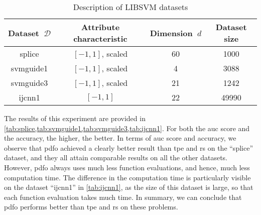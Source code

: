\begin{table}[ht]
    \caption{Description of LIBSVM datasets}
    \label{tab:htdata}
    \centering
    \begin{tabular}{ccS[table-parse-only]S[table-parse-only]}
        \toprule
        Dataset~$\mathcal{D}$   & Attribute characteristic  & {Dimension~$d$}   & {Dataset size}\\
        \midrule
        splice                  & $[-1, 1]$, scaled         & 60                & 1000\\
        svmguide1               & $[-1, 1]$, scaled         & 4                 & 3088\\
        svmguide3               & $[-1, 1]$, scaled         & 21                & 1242\\
        ijcnn1                  & $[-1, 1]$                 & 22                & 49990\\
        \bottomrule
    \end{tabular}
\end{table}
%

The results of this experiment are provided in \cref{tab:splice,tab:svmguide1,tab:svmguide3,tab:ijcnn1}.
For both the \gls{auc} score and the accuracy, the higher, the better.
In terms of \gls{auc} score and accuracy, we observe that \gls{pdfo} achieved a clearly better result than \gls{tpe} and \gls{rs} on the \enquote{splice} dataset, and they all attain comparable results on all the other datasets.
However, \gls{pdfo} always uses much less function evaluations, and hence, much less computation time.
The difference in the computation time is particularly visible on the dataset \enquote{ijcnn1} in \cref{tab:ijcnn1}, as the size of this dataset is large, so that each function evaluation takes much time.
In summary, we can conclude that \gls{pdfo} performs better than \gls{tpe} and \gls{rs} on these problems.

